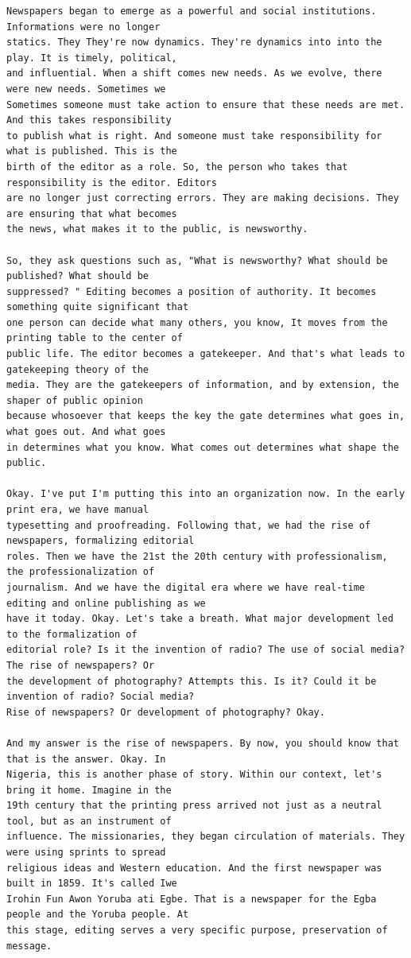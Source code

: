 {\begin{Verbatim}
Newspapers began to emerge as a powerful and social institutions. Informations were no longer
statics. They They're now dynamics. They're dynamics into into the play. It is timely, political,
and influential. When a shift comes new needs. As we evolve, there were new needs. Sometimes we
Sometimes someone must take action to ensure that these needs are met. And this takes responsibility
to publish what is right. And someone must take responsibility for what is published. This is the
birth of the editor as a role. So, the person who takes that responsibility is the editor. Editors
are no longer just correcting errors. They are making decisions. They are ensuring that what becomes
the news, what makes it to the public, is newsworthy.

So, they ask questions such as, "What is newsworthy? What should be published? What should be
suppressed? " Editing becomes a position of authority. It becomes something quite significant that
one person can decide what many others, you know, It moves from the printing table to the center of
public life. The editor becomes a gatekeeper. And that's what leads to gatekeeping theory of the
media. They are the gatekeepers of information, and by extension, the shaper of public opinion
because whosoever that keeps the key the gate determines what goes in, what goes out. And what goes
in determines what you know. What comes out determines what shape the public.

Okay. I've put I'm putting this into an organization now. In the early print era, we have manual
typesetting and proofreading. Following that, we had the rise of newspapers, formalizing editorial
roles. Then we have the 21st the 20th century with professionalism, the professionalization of
journalism. And we have the digital era where we have real-time editing and online publishing as we
have it today. Okay. Let's take a breath. What major development led to the formalization of
editorial role? Is it the invention of radio? The use of social media? The rise of newspapers? Or
the development of photography? Attempts this. Is it? Could it be invention of radio? Social media?
Rise of newspapers? Or development of photography? Okay.

And my answer is the rise of newspapers. By now, you should know that that is the answer. Okay. In
Nigeria, this is another phase of story. Within our context, let's bring it home. Imagine in the
19th century that the printing press arrived not just as a neutral tool, but as an instrument of
influence. The missionaries, they began circulation of materials. They were using sprints to spread
religious ideas and Western education. And the first newspaper was built in 1859. It's called Iwe
Irohin Fun Awon Yoruba ati Egbe. That is a newspaper for the Egba people and the Yoruba people. At
this stage, editing serves a very specific purpose, preservation of message.


\end{Verbatim}}
